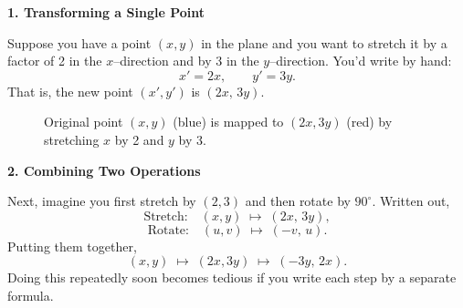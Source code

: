 \bigskip
\noindent\textbf{1. Transforming a Single Point}

Suppose you have a point \((x,y)\) in the plane and you want to stretch it by a factor of 2 in the \(x\)–direction and by 3 in the \(y\)–direction.  You’d write by hand:
\[
x' = 2x,
\qquad
y' = 3y.
\]
That is, the new point \((x',y')\) is \((2x,\,3y)\).

\begin{figure}[H]
    \centering
    \caption{Original point $(x,y)$ (blue) is mapped to $(2x,3y)$ (red) by stretching $x$ by 2 and $y$ by 3.}
\end{figure}


\medskip
\noindent\textbf{2. Combining Two Operations}

Next, imagine you first stretch by \((2,3)\) and then rotate by \(90^\circ\).  Written out,
\[
\text{Stretch:}\quad (x,y)\;\mapsto\;(2x,\,3y),
\]
\[
\text{Rotate:}\quad (u,v)\;\mapsto\;(-v,\,u).
\]
Putting them together,
\[
(x,y)\;\mapsto\;(2x,3y)\;\mapsto\;(-3y,\,2x).
\]
Doing this repeatedly soon becomes tedious if you write each step by a separate formula.


